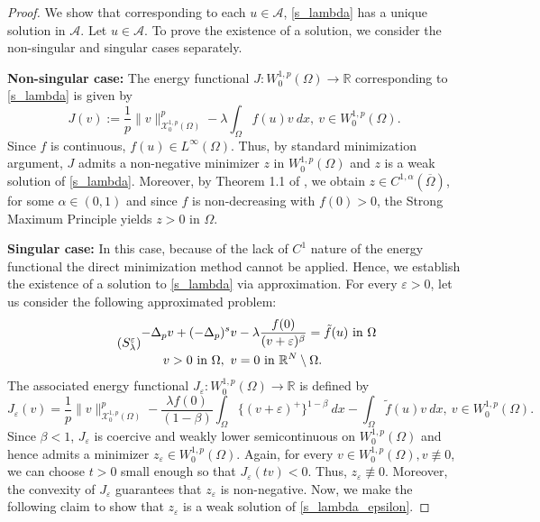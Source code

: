 \documentclass[reqno,oneside]{amsart}
\theoremstyle{definition}
\theoremstyle{remark}
\numberwithin{equation}{section}
\newcommand{\p}{\Delta_p}
\newcommand{\ps}{(-\Delta_p)^s}
\newcommand{\la} {\lambda}
\newcommand{\ba}{\beta}
\newcommand{\Om} {\Omega}
\newcommand{\sr}{\mathbb{R}}
\newcommand{\rar}{\rightarrow}
\newcommand{\wop}{W^{1,p}_0 (\Omega)}
\newcommand{\omc}{(\overline{\Om})}
\newcommand{\bdry}{\mathbb{R}^N \setminus \Omega}
\newcommand{\ftil}{\tilde{f}}
\begin{document}
\begin{proof}
    We show that corresponding to each $u\in\mathcal{A}$, \eqref{s_lambda} has a unique solution in $\mathcal{A}$. Let $u\in\mathcal{A}$. To prove the existence of a solution, we consider the non-singular and singular cases separately.

    \textbf{Non-singular case:} The energy functional $J: \wop \rar \sr$ corresponding to \eqref{s_lambda} is given by
    \[J(v):= \frac{1}{p} \|v\|^p_{\mathcal{X}^{1,p}_0(\Om)} -\la \int_{\Om} f(u)v\ dx,\ v\in\wop. \]
    Since $f$ is continuous, $f(u)\in L^{\infty} (\Om) $. Thus, by standard minimization argument, $J$ admits a non-negative minimizer $z$ in $\wop$ and $z$ is a weak solution of \eqref{s_lambda}. Moreover, by Theorem 1.1 of \cite{antonini2025global}, we obtain $z\in C^{1,\alpha} \omc$, for some $\alpha\in (0,1)$ and since $f$ is non-decreasing with $f(0)>0$, the Strong Maximum Principle yields $z>0$ in $\Om$.

    \textbf{Singular case:} In this case, because of the lack of $C^1$ nature of the energy functional the direct minimization method cannot be applied. Hence, we establish the existence of a solution to \eqref{s_lambda} via approximation. For every $\varepsilon>0$, let us consider the following approximated problem:
    \begin{equation}\tag{$S_{\la}^{\varepsilon}$}\label{s_lambda_epsilon}
        \begin{aligned}
        -\p v + \ps v &-\la \frac{f(0)}{(v+ \varepsilon )^{\ba}} = \tilde{f}(u) \text{ in } \Om\\
        v >0 \text{ in } \Om,\ v &=0 \text{ in } \bdry.
        \end{aligned}
    \end{equation}
    The associated energy functional $J_{\varepsilon}: \wop \rar \sr$ is defined by
    \[ J_{\varepsilon}(v) = \frac{1}{p} \|v\|_{\mathcal{X}^{1,p}_0(\Om)}^p -\frac{\la f(0)}{(1-\ba)} \int_{\Om} \{(v+\varepsilon)^+ \}^{1-\ba}\ dx - \int_{\Om} \ftil (u)v\ dx,\ v\in\wop .\]
    Since $\ba<1$, $J_{\varepsilon}$ is coercive and weakly lower semicontinuous on $\wop$ and hence admits a minimizer $z_{\varepsilon} \in \wop$. Again, for every $v\in\wop, v\not\equiv 0$, we can choose $t>0$ small enough so that $J_{\varepsilon}(tv) <0$. Thus, $z_{\varepsilon}\not\equiv 0$. Moreover, the convexity of $J_{\varepsilon}$ guarantees that $z_{\varepsilon}$ is non-negative. Now, we make the following claim to show that $z_{\varepsilon}$ is a weak solution of \eqref{s_lambda_epsilon}.
    

\end{proof}
\end{document}
